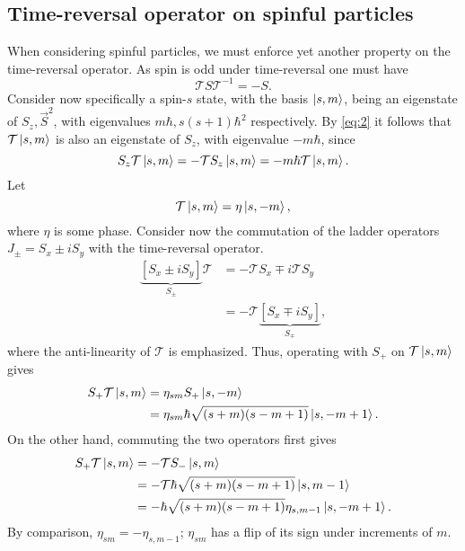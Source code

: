 \subsection{Time-reversal operator on spinful particles}
When considering spinful particles, we must enforce yet another property on the time-reversal operator.
As spin is odd under time-reversal one must have
\begin{equation}
  \label{eq:2}
  \mathcal{T} S \mathcal{T}^{-1} = -S.
\end{equation}
Consider now specifically a spin-$s$ state, with the basis $\ket{s, m}$, being an eigenstate of $S_z, \vec{S}^2$, with eigenvalues $m\hbar, s(s+1) \hbar^2$ respectively.
By \cref{eq:2} it follows that $\mathcal{T} \ket{s, m}$ is also an  eigenstate of $S_z$, with eigenvalue $-m \hbar $, since
\begin{equation}
  S_z \mathcal{T} \ket{s, m} = -\mathcal{T}  S_z \ket{s, m} = -m \hbar \mathcal{T} \ket{s, m}.
\end{equation}
Let
\[
  \mathcal{T} \ket{s, m} = \eta \ket{s, -m},
\]
where $\eta $ is some phase.
Consider now the commutation of the ladder operators $J_{\pm} = S_x \pm i S_y$ with the time-reversal operator.
\begin{equation}
  \begin{split}
    \underbrace{\left[ S_x \pm i S_y \right]}_{S_{\pm}} \mathcal{T}  &= -\mathcal{T} S_x \mp i \mathcal{T} S_y\\
    &= -\mathcal{T} \underbrace{\left[ S_x \mp iS_y \right]}_{S_{\mp}},
  \end{split}
\end{equation}
where the anti-linearity of $\mathcal{T} $ is emphasized.
Thus, operating with $S_+$ on $\mathcal{T} \ket{s, m}$ gives
\begin{align}
  S_+ \mathcal{T} \ket{s, m} &= \eta_{sm} S_+ \ket{s, -m}\\
  &= \eta_{sm} \hbar \sqrt{(s+m) (s-m+1)} \ket{s, -m +  1}.
\end{align}
On the other hand, commuting the two operators first gives
\begin{align}
  S_+ \mathcal{T}  \ket{s, m} &= - \mathcal{T}  S_- \ket{s, m}\\
                         &= - \mathcal{T} \hbar \sqrt{(s+m)(s-m+1)} \ket{s, m-1}\\
  &= -\hbar \sqrt{(s+m)(s-m+1)} \eta_{s, m-1} \ket{s, -m + 1}.
\end{align}
By comparison, $\eta _{sm}= - \eta _{s, m-1}$; $\eta _{sm}$ has a flip of its sign under increments of $m$.
